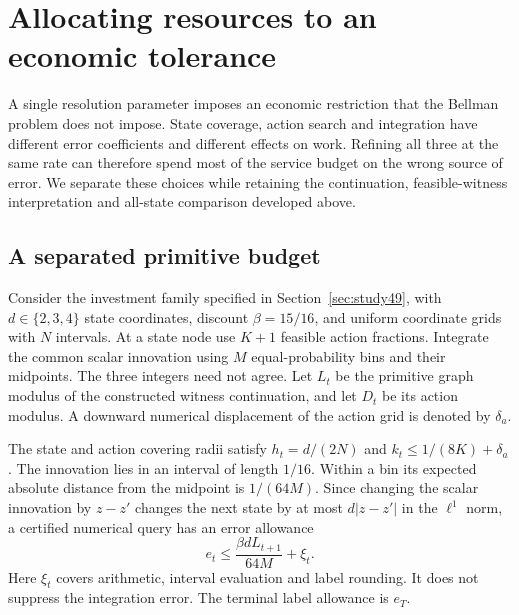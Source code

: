 \section{Allocating resources to an economic tolerance}\label{sec:resources49}
A single resolution parameter imposes an economic restriction that the Bellman problem does not impose. State coverage, action search and integration have different error coefficients and different effects on work. Refining all three at the same rate can therefore spend most of the service budget on the wrong source of error. We separate these choices while retaining the continuation, feasible-witness interpretation and all-state comparison developed above.

\subsection{A separated primitive budget}
Consider the investment family specified in Section~\ref{sec:study49}, with $d\in\{2,3,4\}$ state coordinates, discount $\beta=15/16$, and uniform coordinate grids with $N$ intervals. At a state node use $K+1$ feasible action fractions. Integrate the common scalar innovation using $M$ equal-probability bins and their midpoints. The three integers need not agree. Let $L_t$ be the primitive graph modulus of the constructed witness continuation, and let $D_t$ be its action modulus. A downward numerical displacement of the action grid is denoted by $\delta_a$.

The state and action covering radii satisfy $h_t=d/(2N)$ and $k_t\le 1/(8K)+\delta_a$. The innovation lies in an interval of length $1/16$. Within a bin its expected absolute distance from the midpoint is $1/(64M)$. Since changing the scalar innovation by $z-z'$ changes the next state by at most $d|z-z'|$ in the $\ell^1$ norm, a certified numerical query has an error allowance
\begin{equation}\label{eq:query49}
 e_t\le\frac{\beta d L_{t+1}}{64M}+\xi_t.
\end{equation}
Here $\xi_t$ covers arithmetic, interval evaluation and label rounding. It does not suppress the integration error. The terminal label allowance is $e_T$.

